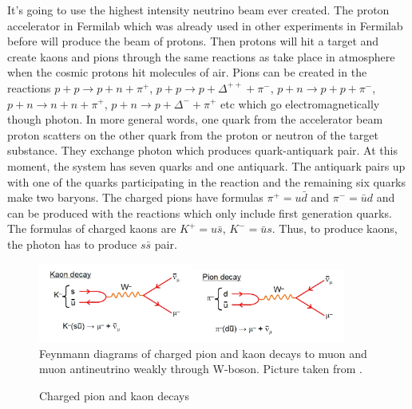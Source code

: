 It's going to use the highest intensity neutrino beam ever created. The proton accelerator in Fermilab which was already used in other experiments in Fermilab before will produce the beam of protons. Then protons will hit a target and create kaons and pions through the same reactions as take place in atmosphere when the cosmic protons hit molecules of air.  Pions can be created in the reactions $p+p \rightarrow p+n+\pi^+$, $p+p \rightarrow p+\Delta^{++}+\pi^-$, $p+n \rightarrow p+p+\pi^-$, $p+n \rightarrow n+n+\pi^+$, $p+n \rightarrow p+\Delta^{-}+\pi^+$ etc which go electromagnetically though photon. In more general words, one quark from the accelerator beam proton scatters on the other quark from the proton or neutron of the target substance. They exchange photon which produces quark-antiquark pair. At this moment, the system has seven quarks and one antiquark. The antiquark pairs up with one of the quarks participating in the reaction and the remaining six quarks make two baryons.  The charged pions have formulas $\pi^+ = u\bar{d}$ and $\pi^- = \bar{u}d$ and can be produced with the reactions which only include first generation quarks. The formulas of charged kaons are $K^+ = u\bar{s}$, $K^- = \bar{u}s$. Thus, to produce kaons, the photon has to produce $s\bar{s}$ pair. 

\begin{figure}
\caption{Charged pion and kaon decays}
\label{fig:pionAndKaonDecays}
\centering
\includegraphics[width=0.45\textwidth, keepaspectratio=true]{figs/kaonDecay.jpg}\includegraphics[width=0.45\textwidth, keepaspectratio=true]{figs/pionDecay.jpg}
\\Feynmann diagrams of charged pion and kaon decays to muon and muon antineutrino weakly through W-boson. Picture taken from \cite{ref_fig_pionandKaonDecays}.   
\end{figure}


